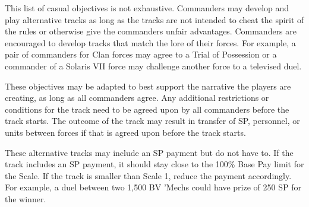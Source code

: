 This list of casual objectives is not exhaustive.
Commanders may develop and play alternative tracks as long as the tracks are not intended to cheat the spirit of the rules or otherwise give the commanders unfair advantages.
Commanders are encouraged to develop tracks that match the lore of their forces.
For example, a pair of commanders for Clan forces may agree to a Trial of Possession or a commander of a Solaris VII force may challenge another force to a televised duel.

These objectives may be adapted to best support the narrative the players are creating, as long as all commanders agree.
Any additional restrictions or conditions for the track need to be agreed upon by all commanders before the track starts.
The outcome of the track may result in transfer of SP, personnel, or units between forces if that is agreed upon before the track starts.

These alternative tracks may include an SP payment but do not have to.
If the track includes an SP payment, it should stay close to the 100\% Base Pay limit for the Scale.
If the track is smaller than Scale 1, reduce the payment accordingly.
For example, a duel between two 1,500 BV 'Mechs could have prize of 250 SP for the winner.
